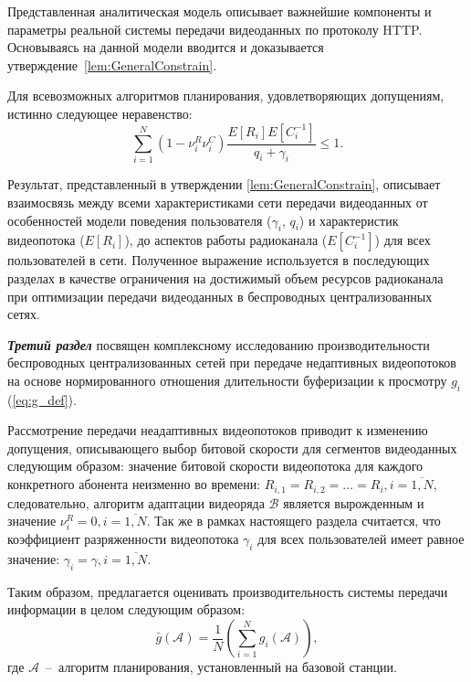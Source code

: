 Представленная аналитическая модель описывает важнейшие компоненты и параметры реальной системы передачи видеоданных по протоколу HTTP. Основываясь на данной модели вводится и доказывается утверждение~\ref{lem:GeneralConstrain}.

\begin{lemma}
\label{lem:GeneralConstrain}
Для всевозможных алгоритмов планирования, удовлетворяющих допущениям, истинно следующее неравенство:
\emph{
\begin{equation}
	\label{eq:GeneralConstrain}
	\nonumber
	\sum\limits_{i=1}^{N} {\left(1-\nu^R_i\nu^C_i\right)\frac{E[R_i]E[C_i^{-1}]}{q_i + \gamma_i}} \leq 1.
\end{equation}
}
\end{lemma}

Результат, представленный в утверждении \ref{lem:GeneralConstrain}, описывает взаимосвязь между всеми характеристиками сети передачи видеоданных от особенностей модели поведения пользователя ($\gamma_i$, $q_i$) и характеристик видеопотока ($E[R_i]$), до аспектов работы радиоканала ($E[C_i^{-1}]$) для всех пользователей в сети. Полученное выражение используется в последующих разделах в качестве ограничения на достижимый объем ресурсов радиоканала при оптимизации передачи видеоданных в беспроводных централизованных сетях.

\textbf{\textit{Третий раздел}} посвящен комплексному исследованию производительности беспроводных централизованных сетей при передаче недаптивных видеопотоков на основе нормированного отношения длительности буферизации к просмотру $g_i$ (\ref{eq:g_def}).

Рассмотрение передачи неадаптивных видеопотоков приводит к изменению допущения, описывающего выбор битовой скорости для сегментов видеоданных следующим образом: значение битовой скорости видеопотока для каждого конкретного абонента неизменно во времени: $R_{i,1} = R_{i,2} = \ldots = R_i, i=\overline{1,N}$, следовательно, алгоритм адаптации видеоряда $\mathcal{B}$ является вырожденным и значение $\nu^R_i = 0, i = \overline{1,N}$. Так же в рамках настоящего раздела считается, что коэффициент разряженности видеопотока $\gamma_i$ для всех пользователей имеет равное значение: $\gamma_i = \gamma, i=\overline{1,N}$.

Таким образом, предлагается оценивать производительность системы передачи информации в целом следующим образом:
$$\bar{g}\left(\mathcal{A}\right) = \frac{1}{N}\left(\sum\limits_{i=1}^{N} {g_i\left(\mathcal{A}\right)}\right),$$
где $\mathcal{A}$~--~алгоритм планирования, установленный на базовой станции.

